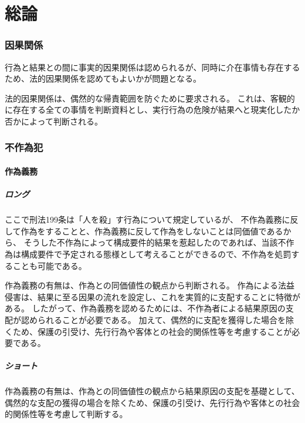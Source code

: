 \documentclass[11pt]{jsarticle}
\title{\vspace{-30mm}{\textgt{\Large{刑法論証集}}}}
\date{\vspace{-15mm}}
\begin{document}
\maketitle

\part{総論}

	\section{因果関係}
		行為と結果との間に事実的因果関係は認められるが、同時に介在事情も存在するため、法的因果関係を認めてもよいかが問題となる。
		
		法的因果関係は、偶然的な帰責範囲を防ぐために要求される。
		これは、客観的に存在する全ての事情を判断資料とし、実行行為の危険が結果へと現実化したか否かによって判断される。
		
	\section{不作為犯}
		\subsection{作為義務}
			\subsubsection{ロング}
				ここで刑法199条は「人を殺」す行為について規定しているが、
				不作為義務に反して作為をすることと、作為義務に反して作為をしないことは同価値であるから、
				そうした不作為によって構成要件的結果を惹起したのであれば、当該不作為は構成要件で予定される態様として考えることができるので、不作為を処罰することも可能である。
		
				作為義務の有無は、作為との同価値性の観点から判断される。
				作為による法益侵害は、結果に至る因果の流れを設定し、これを実質的に支配することに特徴がある。
				したがって、作為義務を認めるためには、不作為者による結果原因の支配が認められることが必要である。
				加えて、偶然的に支配を獲得した場合を除くため、保護の引受け、先行行為や客体との社会的関係性等を考慮することが必要である。
			
			\subsubsection{ショート}
				作為義務の有無は、作為との同価値性の観点から結果原因の支配を基礎として、
				偶然的な支配の獲得の場合を除くため、保護の引受け、先行行為や客体との社会的関係性等を考慮して判断する。
	
\end{document}
